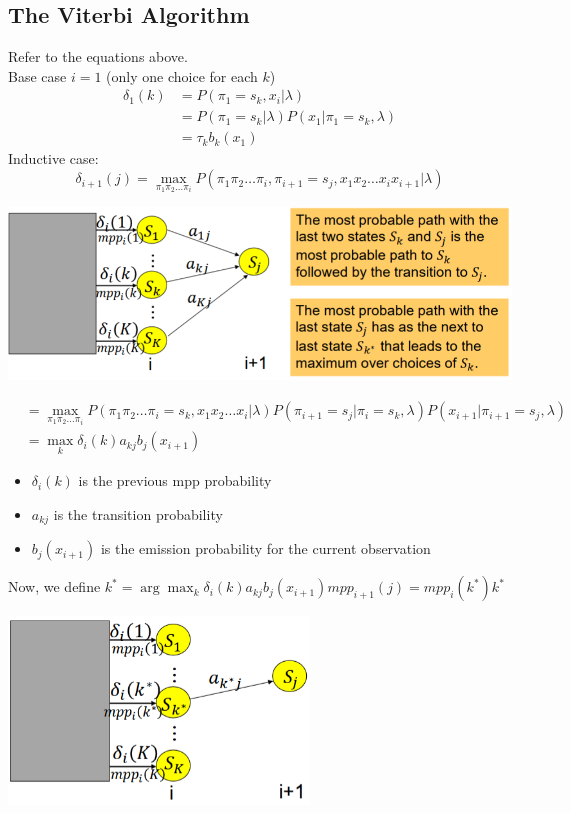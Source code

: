\documentclass[10pt]{article}
\begin{document}
\subsection*{The Viterbi Algorithm}
Refer to the equations above.\\
Base case $i = 1$ (only one choice for each $k$)
\begin{align*}
    \delta_1(k) &= P(\pi_1 = s_k, x_i | \lambda)\\
    &= P(\pi_1 = s_k | \lambda) P(x_1 | \pi_1 = s_k, \lambda)\\
    &= \tau_k b_k (x_1)
\end{align*}
Inductive case:
\[\delta_{i + 1}(j) = \max_{\pi_1 \pi_2 \dots \pi_i} P(\pi_1 \pi_2 \dots \pi_i, \pi_{i + 1} = s_j, x_1 x_2 \dots x_i x_{i + 1} | \lambda)\]
\begin{center} 
	\includegraphics*[width=\textwidth]{W9_24.png} 
\end{center}
\begin{align*}
    &= \max_{\pi_1 \pi_2 \dots \pi_i} P(\pi_1 \pi_2 \dots \pi_i = s_k, x_1 x_2 \dots x_i | \lambda) P(\pi_{i + 1} = s_j | \pi_i = s_k, \lambda) P(x_{i + 1} | \pi_{i + 1} = s_j, \lambda)\\
    &= \max_k \delta_i(k) a_{kj} b_j (x_{i + 1})
\end{align*}
\begin{itemize}
	\item $\delta_i(k)$ is the previous mpp probability
	\item $a_{kj}$ is the transition probability
	\item $b_j(x_{i + 1})$ is the emission probability for the current observation
\end{itemize}
Now, we define $k^* = \arg \max_{k} \delta_i(k) a_{kj} b_j (x_{i + 1}) mpp_{i + 1}(j) = mpp_{i}(k^*) k^*$
\begin{center} 
	\includegraphics*[width=0.6\textwidth]{W9_25.png} 
\end{center}
\end{document}
